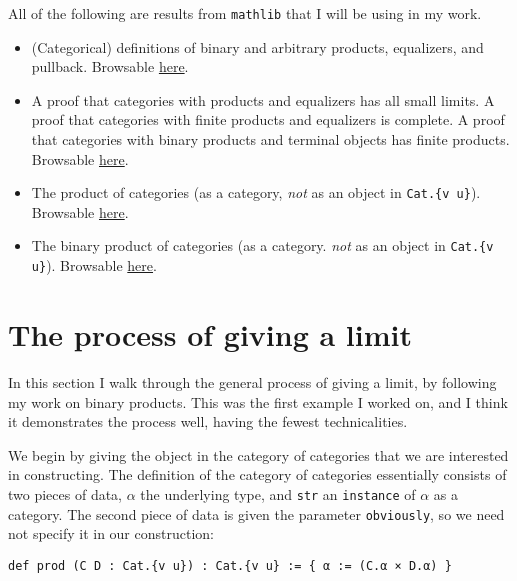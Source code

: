 \documentclass{article}
\newcommand{\al}{\alpha}
\newcommand{\<}{\langle}
\renewcommand{\>}{\rangle}
\theoremstyle{definitionstyle}
\theoremstyle{exercisestyle}
\theoremstyle{remarkstyle}
\begin{document}
All of the following are results from \texttt{mathlib} that I will be using in my work.
\begin{itemize}
  \item (Categorical) definitions of binary and arbitrary products,
        equalizers, and pullback.
        Browsable \href{https://leanprover-community.github.io/mathlib_docs/category_theory/limits/shapes/products.html}{here}.
  \item A proof that categories with products and equalizers has all small limits.
        A proof that categories with finite products and equalizers is complete.
        A proof that categories with binary products and terminal objects has finite products.
        Browsable \href{https://leanprover-community.github.io/mathlib_docs/category_theory/limits/constructions/limits_of_products_and_equalizers.html}{here}.
  \item The product of categories (as a category, \textit{not} as an object in \texttt{Cat.\{v u\}}).
        Browsable \href{https://leanprover-community.github.io/mathlib_docs/category_theory/pi/basic.html}{here}.
  \item The binary product of categories (as a category. \textit{not} as an object in \texttt{Cat.\{v u\}}).
        Browsable \href{https://leanprover-community.github.io/mathlib_docs/category_theory/products/basic.html}{here}.
\end{itemize}

\section{The process of giving a limit}

In this section I walk through the general process of giving a limit,
by following my work on binary products.
This was the first example I worked on, and I think it
demonstrates the process well, having the fewest technicalities.

We begin by giving the object in the category of categories
that we are interested in constructing.
The definition of the category of categories essentially consists
of two pieces of data, $\al$ the underlying type,
and \texttt{str} an \texttt{instance} of $\al$ as a category.
The second piece of data is given the parameter \texttt{obviously},
so we need not specify it in our construction:

\begin{lstlisting}
def prod (C D : Cat.{v u}) : Cat.{v u} := { α := (C.α × D.α) } \end{lstlisting}
\end{document}
